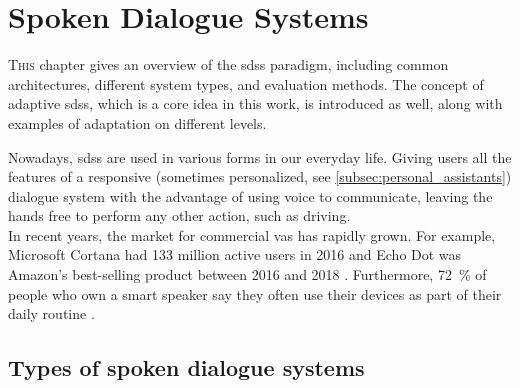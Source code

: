 \chapter{Spoken Dialogue Systems}
\label{chap:spoken_dialogue_systems}

\lettrine{T}{his} chapter gives an overview of the \aclp{sds} paradigm, including common architectures, different system types, and evaluation methods.
The concept of adaptive \aclp{sds}, which is a core idea in this work, is introduced as well, along with examples of adaptation on different levels.

\pagebreak



Nowadays, \acfp{sds} are used in various forms in our everyday life.
Giving users all the features of a responsive (sometimes personalized, see \cref{subsec:personal_assistants}) dialogue system with the advantage of using voice to communicate, leaving the hands free to perform any other action, such as driving.\\

In recent years, the market for commercial \acp{va} has rapidly grown.
For example, Microsoft Cortana had 133 million active users in 2016 \citep{Osborne2016why} and Echo Dot was Amazon's best-selling product between 2016 and 2018 \citep{Dickey2017echo}.
Furthermore, \SI{72}{\percent} of people who own a smart speaker say they often use their devices as part of their daily routine \citep{Kleinberg2018ways}.


\section{Types of spoken dialogue systems}
\label{sec:types_of_sdss}


